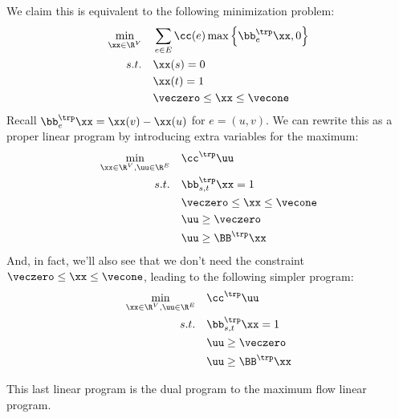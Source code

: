 We claim this is equivalent to the following
minimization problem:
\begin{align}
  \begin{aligned}
    \min_{\xx \in \R^{V}} \quad &\sum_{e\in E} \cc(e) \max\left\{\bb_e^\trp \xx, 0\right\} \\
    s.t. \quad & \xx(s) = 0 \\
    & \xx(t) = 1 \\
    &\veczero\leq \xx\leq \vecone \\
  \end{aligned}
  \label{prog1}
\end{align}
Recall $\bb_e^\trp \xx = \xx(v) - \xx(u)$ for $e = (u, v)$.
We can rewrite this as a proper linear program by
introducing extra variables for the maximum:
\begin{align}
  \begin{aligned}
    \min_{\xx \in \R^{V}, \uu \in \R^{E}} \quad & \cc^\trp \uu \\
    s.t. \quad & \bb_{s,t}^\trp\xx = 1 \\
    &\veczero\leq \xx\leq \vecone \\
    &\uu \geq \veczero \\
    &\uu \geq \BB^\trp \xx \\
  \end{aligned}
  \label{prog2}
\end{align}
And, in fact, we'll also see that we don't need the constraint
$\veczero\leq \xx\leq \vecone$, leading to the following simpler
program:
\begin{align}
  \begin{aligned}
    \min_{\xx \in \R^{V}, \uu \in \R^{E}} \quad & \cc^\trp \uu \\
    s.t. \quad & \bb_{s,t}^\trp\xx = 1 \\
    &\uu \geq \veczero \\
    &\uu \geq \BB^\trp \xx \\
  \end{aligned}
  \label{prog3}
\end{align}

This last linear program is the dual program to the maximum flow linear program.

